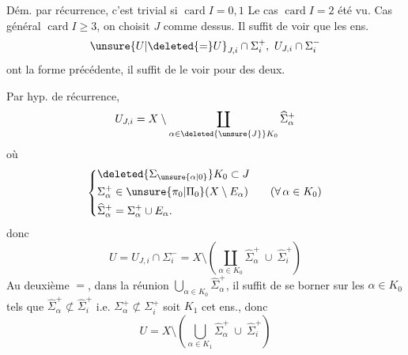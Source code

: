 Dém. par récurrence, c'est trivial si $\operatorname{card} I=0,1$ Le cas $\operatorname{card} I=2$  été vu. Cas général  $\operatorname{card} I\geq 3$, on choisit $J$ comme dessus. Il suffit de voir que les ens.
\[
\unsure{U|\deleted{=}U}_{J,i}\cap\Sigma_i^+,\ U_{J,i}\cap\Sigma_i^-
\]
ont la forme précédente, il suffit de le voir pour  des deux.

Par hyp. de récurrence, 
\[
U_{J,i}=X\setminus\coprod_{\alpha\in \deleted{\unsure{J}}K_0}\widehat{\Sigma}_\alpha^+
\]
où
\[
\left\{\begin{aligned}
&\deleted{\Sigma_{\unsure{\alpha|0}}}K_0\subset J\\
&\Sigma_\alpha^+\in\unsure{\pi_0|\Pi_0}(X\setminus E_\alpha)\qquad (\forall\,\alpha\in K_0)\\
&\widehat{\Sigma}_\alpha^+=\Sigma_\alpha^+\cup E_\alpha.
\end{aligned}\right.
\]
 donc
\[
U=U_{J,i}\cap\Sigma_i^-=X\setminus\left(\coprod_{\alpha\in K_0}\widehat{\Sigma}_\alpha^+\ \cup\ \widehat{\Sigma}_i^+\right)
\]
 Au deuxième $=$, dans la  réunion $\bigcup_{\alpha\in K_0}\widehat{\Sigma}_\alpha^+$, il suffit de se borner   sur les \deleted{$\Sigma$} $\alpha\in K_0$ tels que $\widehat{\Sigma}_\alpha^+\not\subset\widehat{\Sigma}_i^+$ i.e. $\Sigma_\alpha^+\not\subset\Sigma_i^+$ soit $K_1$ cet ens., donc
\[
U=X\setminus\left(\bigcup_{\alpha\in K_1}\widehat{\Sigma}_\alpha^+\ \cup\ \widehat{\Sigma}_i^+\right)
\]
